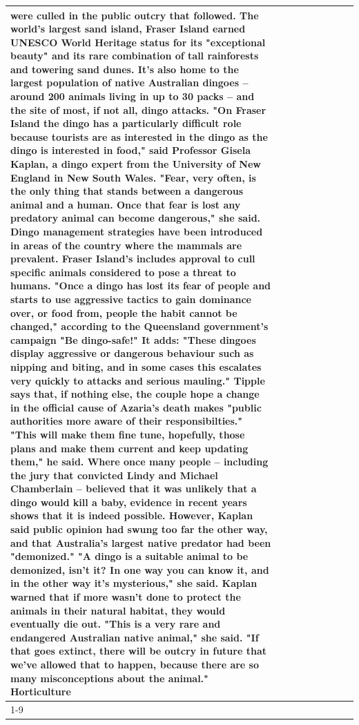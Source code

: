\begin{table}[H]
\begin{tabular}{lllrlllll}
were culled in the public outcry that followed. The world's largest sand island, Fraser Island earned UNESCO World Heritage status for its "exceptional beauty" and its rare combination of tall rainforests and towering sand dunes. It's also home to the largest population of native Australian dingoes -- around 200 animals living in up to 30 packs -- and the site of most, if not all, dingo attacks. "On Fraser Island the dingo has a particularly difficult role because tourists are as interested in the dingo as the dingo is interested in food," said Professor Gisela Kaplan, a dingo expert from the University of New England in New South Wales. "Fear, very often, is the only thing that stands between a dangerous animal and a human. Once that fear is lost any predatory animal can become dangerous," she said. Dingo management strategies have been introduced in areas of the country where the mammals are prevalent. Fraser Island's includes approval to cull specific animals considered to pose a threat to humans. "Once a dingo has lost its fear of people and starts to use aggressive tactics to gain dominance over, or food from, people the habit cannot be changed," according to the Queensland government's campaign "Be dingo-safe!" It adds: "These dingoes display aggressive or dangerous behaviour such as nipping and biting, and in some cases this escalates very quickly to attacks and serious mauling." Tipple says that, if nothing else, the couple hope a change in the official cause of Azaria's death makes "public authorities more aware of their responsibilties." "This will make them fine tune, hopefully, those plans and make them current and keep updating them," he said. Where once many people -- including the jury that convicted Lindy and Michael Chamberlain -- believed that it was unlikely that a dingo would kill a baby, evidence in recent years shows that it is indeed possible. However, Kaplan said public opinion had swung too far the other way, and that Australia's largest native predator had been "demonized." "A dingo is a suitable animal to be demonized, isn't it? In one way you can know it, and in the other way it's mysterious," she said. Kaplan warned that if more wasn't done to protect the animals in their natural habitat, they would eventually die out. "This is a very rare and endangered Australian native animal," she said. "If that goes extinct, there will be outcry in future that we've allowed that to happen, because there are so many misconceptions about the animal." Horticulture \\
\cline{1-9}

\end{tabular}
\end{table}
